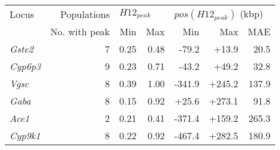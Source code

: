 \begin{tabular}{lrrrrrr}
\toprule
           Locus &   Populations & \multicolumn{2}{l}{$H12_{peak}$} & \multicolumn{3}{l}{$pos(H12_{peak})$ (kbp)} \\
                 & No. with peak &          Min &  Max &                     Min &    Max &   MAE \\
\midrule
  \textit{Gste2} &             7 &         0.25 & 0.48 &                   -79.2 &  +13.9 &  20.5 \\
 \textit{Cyp6p3} &             9 &         0.23 & 0.71 &                   -43.2 &  +49.2 &  32.8 \\
   \textit{Vgsc} &             8 &         0.39 & 1.00 &                  -341.9 & +245.2 & 137.9 \\
   \textit{Gaba} &             8 &         0.15 & 0.92 &                   +25.6 & +273.1 &  91.8 \\
   \textit{Ace1} &             2 &         0.21 & 0.41 &                  -371.4 & +159.2 & 265.3 \\
 \textit{Cyp9k1} &             8 &         0.22 & 0.92 &                  -467.4 & +282.5 & 180.9 \\
\bottomrule
\end{tabular}
